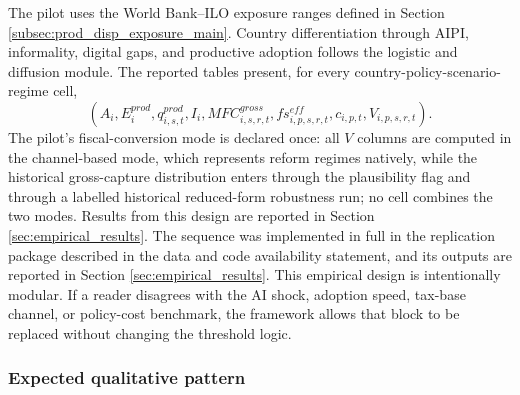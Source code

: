 \documentclass[11pt,a4paper]{article}
\begin{document}
The pilot uses the World Bank--ILO exposure ranges defined in Section \ref{subsec:prod_disp_exposure_main}. Country differentiation through AIPI, informality, digital gaps, and productive adoption follows the logistic and diffusion module.
The reported tables present, for every country-policy-scenario-regime cell,
\begin{equation}
    \left(A_i,E^{prod}_i,q^{prod}_{i,s,t},I_i,MFC^{gross}_{i,s,r,t},fs^{eff}_{i,p,s,r,t},c_{i,p,t},V_{i,p,s,r,t}\right).
\end{equation}
The pilot's fiscal-conversion mode is declared once: all $V$ columns are computed in the channel-based mode, which represents reform regimes natively, while the historical gross-capture distribution enters through the plausibility flag and through a labelled historical reduced-form robustness run; no cell combines the two modes. Results from this design are reported in Section \ref{sec:empirical_results}.
The sequence was implemented in full in the replication package described in the data and code availability statement, and its outputs are reported in Section \ref{sec:empirical_results}.
This empirical design is intentionally modular. If a reader disagrees with the AI shock, adoption speed, tax-base channel, or policy-cost benchmark, the framework allows that block to be replaced without changing the threshold logic.

\subsubsection{Expected qualitative pattern}\label{sec:expected}
\end{document}
